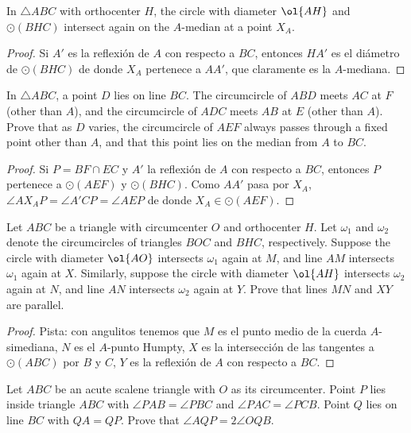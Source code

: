 \begin{probEG}
  In $\triangle ABC$ with orthocenter $H$, the circle with diameter $\ol{AH}$
  and $\odot(BHC)$ intersect again on the $A$-median at a point $X_A$.
\end{probEG}

\begin{proof}
  Si $A'$ es la reflexión de $A$ con respecto a $BC$, entonces $HA'$ es el
  diámetro de $\odot(BHC)$ de donde $X_A$ pertenece a $AA'$, que claramente es
  la $A$-mediana.
\end{proof}

\begin{probEG}
  In $\triangle ABC$, a point $D$ lies on line $BC$. The circumcircle of $ABD$
  meets $AC$ at $F$ (other than $A$), and the circumcircle of $ADC$ meets $AB$
  at $E$ (other than $A$). Prove that as $D$ varies, the circumcircle of $AEF$
  always passes through a fixed point other than $A$, and that this point lies
  on the median from $A$ to $BC$.
\end{probEG}

\begin{proof}
  Si $P=BF\cap EC$ y $A'$ la reflexión de $A$ con respecto a $BC$, entonces $P$
  pertenece a $\odot(AEF)$ y $\odot(BHC)$. Como $AA'$ pasa por $X_A$,
  $\angle AX_AP=\angle A'CP=\angle AEP$ de donde $X_A\in\odot(AEF)$.
\end{proof}

\begin{probEG}[ELMO 2014/5]
  Let $ABC$ be a triangle with circumcenter $O$ and orthocenter $H$. Let
  $\omega_1$ and $\omega_2$ denote the circumcircles of triangles $BOC$ and
  $BHC$, respectively. Suppose the circle with diameter $\ol{AO}$ intersects
  $\omega_1$ again at $M$, and line $AM$ intersects $\omega_1$ again at $X$.
  Similarly, suppose the circle with diameter $\ol{AH}$ intersects $\omega_2$
  again at $N$, and line $AN$ intersects $\omega_2$ again at $Y$. Prove that
  lines $MN$ and $XY$ are parallel.
\end{probEG}

\begin{proof}
  Pista: con angulitos tenemos que $M$ es el punto medio de la cuerda
  $A$-simediana, $N$ es el $A$-punto Humpty, $X$ es la intersección de las
  tangentes a $\odot(ABC)$ por $B$ y $C$, $Y$ es la reflexión de $A$ con
  respecto a $BC$.
\end{proof}

\begin{probEG}
  Let $ABC$ be an acute scalene triangle with $O$ as its circumcenter. Point $P$
  lies inside triangle $ABC$ with $\angle PAB=\angle PBC$ and
  $\angle PAC=\angle PCB$. Point $Q$ lies on line $BC$ with $QA=QP$. Prove that
  $\angle AQP=2\angle OQB$.
\end{probEG}

